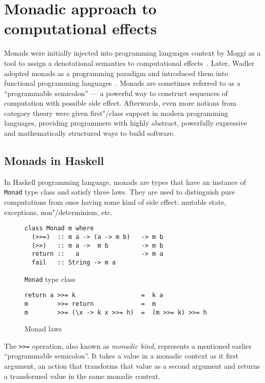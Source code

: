 \chapter{Monadic approach to computational effects}
\label{cpt-parsers}

  Monads were initially injected into programming languages context by Moggi as a tool to
  assign a denotational semantics to computational effects~\cite{Moggi:1991:NCM:116981.116984}. Later, Wadler adopted monads as a programming
  paradigm and introduced them into functional programming languages~\cite{Wadler:1992:EFP:143165.143169}. Monads are sometimes referred to as a ``programmable semicolon'' --- a powerful way to construct sequences of computation with possible side effect. Afterwards, even more notions from category theory were given first"/class support in modern programming languages, providing programmers with highly abstract, powerfully expressive and mathematically structured ways to build software.

    \section{Monads in Haskell}

    In Haskell programming language, monads are types that have an instance of \texttt{Monad} type class and satisfy three laws. They are used
    to distinguish pure computations from ones having some kind of side effect:
    mutable state, exceptions, non"/determinism, etc.

    \begin{figure}[h]
    \begin{lstlisting}
class Monad m where
  (>>=)  :: m a -> (a -> m b)   -> m b
  (>>)   :: m a ->  m b         -> m b
  return ::   a                 -> m a
  fail   :: String -> m a
    \end{lstlisting}
    \caption{\texttt{Monad} type class}
    \label{listing:monadClass}
    \end{figure}

    \begin{figure}[h]
    \begin{lstlisting}
return a >>= k                  =  k a
m        >>= return             =  m
m        >>= (\x -> k x >>= h)  =  (m >>= k) >>= h
    \end{lstlisting}
    \caption{Monad laws}
    \label{listing:monadLaws}
    \end{figure}

    The \lstinline{>>=} operation, also known as \emph{monadic bind}, represents
    a mentioned earlier ``programmable semicolon''. It takes a value in a monadic context as it first argument, an action that transforms that value as a second argument and returns a transformed value in the same monadic context.

